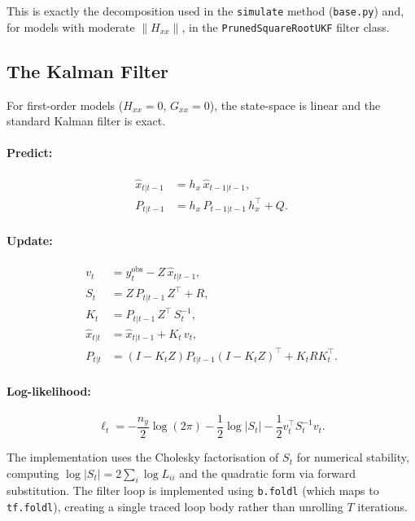 \documentclass[11pt,a4paper]{article}
\theoremstyle{definition}
\newcommand{\code}[1]{\texttt{\color{codecolor}#1}}
\begin{document}
	This is exactly the decomposition used in the \code{simulate} method (\code{base.py}) and, for models with moderate $\|H_{xx}\|$, in the \code{PrunedSquareRootUKF} filter class.
	
	\subsection{The Kalman Filter}
	\label{sec:kalman}
	
	For first-order models ($H_{xx} = 0$, $G_{xx} = 0$), the state-space is linear and the standard Kalman filter is exact.
	
	\paragraph{Predict:}
	\begin{align}
		\hat{x}_{t|t-1} &= h_x \, \hat{x}_{t-1|t-1}, \label{eq:kf_xp}\\
		P_{t|t-1} &= h_x \, P_{t-1|t-1} \, h_x^\top + Q. \label{eq:kf_pp}
	\end{align}
	
	\paragraph{Update:}
	\begin{align}
		v_t &= y_t^{\mathrm{obs}} - Z \, \hat{x}_{t|t-1}, \label{eq:kf_innov}\\
		S_t &= Z \, P_{t|t-1} \, Z^\top + R, \label{eq:kf_S}\\
		K_t &= P_{t|t-1} \, Z^\top \, S_t^{-1}, \label{eq:kf_K}\\
		\hat{x}_{t|t} &= \hat{x}_{t|t-1} + K_t \, v_t, \label{eq:kf_xu}\\
		P_{t|t} &= (I - K_t Z) P_{t|t-1}(I - K_t Z)^\top + K_t R K_t^\top. \label{eq:kf_pu}
	\end{align}
	
	\paragraph{Log-likelihood:}
	\begin{equation}\label{eq:kf_ll}
		\ell_t = -\frac{n_y}{2}\log(2\pi) - \frac{1}{2}\log|S_t| - \frac{1}{2}v_t^\top S_t^{-1} v_t.
	\end{equation}
	
	The implementation uses the Cholesky factorisation of $S_t$ for numerical stability, computing $\log|S_t| = 2\sum_i \log L_{ii}$ and the quadratic form via forward substitution.
	The filter loop is implemented using \code{b.foldl} (which maps to \code{tf.foldl}), creating a single traced loop body rather than unrolling $T$ iterations.
	
\end{document}
